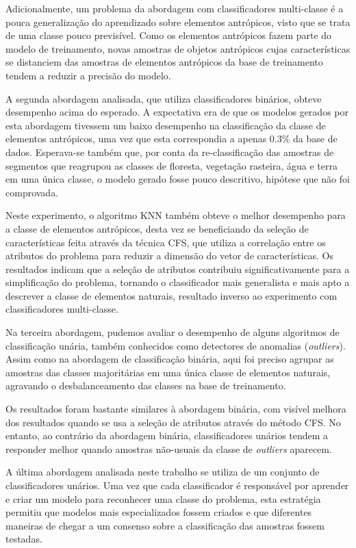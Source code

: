 Adicionalmente, um problema da abordagem com classificadores multi-classe é a pouca generalização do aprendizado sobre elementos antrópicos, visto que se trata de uma classe pouco previsível. Como os elementos antrópicos fazem parte do modelo de treinamento, novas amostras de objetos antrópicos cujas características se distanciem das amostras de elementos antrópicos da base de treinamento tendem a reduzir a precisão do modelo.

A segunda abordagem analisada, que utiliza classificadores binários, obteve desempenho acima do esperado. A expectativa era de que os modelos gerados por esta abordagem tivessem um baixo desempenho na classificação da classe de elementos antrópicos, uma vez que esta correspondia a apenas 0.3\% da base de dados. Esperava-se também que, por conta da re-classificação das amostras de segmentos que reagrupou as classes de floresta, vegetação rasteira, água e terra em uma única classe, o modelo gerado fosse pouco descritivo, hipótese que não foi comprovada.

Neste experimento, o algoritmo KNN também obteve o melhor desempenho para a classe de elementos antrópicos, desta vez se beneficiando da seleção de características feita através da técnica CFS, que utiliza a correlação entre os atributos do problema para reduzir a dimensão do vetor de características. Os resultados indicam que a seleção de atributos contribuiu significativamente para a simplificação do problema, tornando o classificador mais generalista e mais apto a descrever a classe de elementos naturais, resultado inverso ao experimento com classificadores multi-classe.

Na terceira abordagem, pudemos avaliar o desempenho de alguns algoritmos de classificação unária, também conhecidos como detectores de anomalias (\textit{outliers}). Assim como na abordagem de classificação binária, aqui foi preciso agrupar as amostras das classes majoritárias em uma única classe de elementos naturais, agravando o desbalanceamento das classes na base de treinamento.

Os resultados foram bastante similares à abordagem binária, com visível melhora dos resultados quando se usa a seleção de atributos através do método CFS. No entanto, ao contrário da abordagem binária, classificadores unários tendem a responder melhor quando amostras não-usuais da classe de \textit{outliers} aparecem.

A última abordagem analisada neste trabalho se utiliza de um conjunto de classificadores unários. Uma vez que cada classificador é responsável por aprender e criar um modelo para reconhecer uma classe do problema, esta estratégia permitiu que modelos mais especializados fossem criados e que diferentes maneiras de chegar a um consenso sobre a classificação das amostras fossem testadas.


